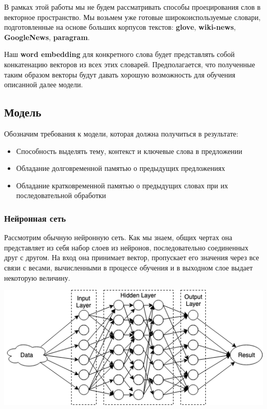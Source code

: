 В рамках этой работы мы не будем рассматривать способы проецирования слов в векторное пространство. Мы возьмем уже готовые широкоиспользуемые словари, подготовленные на основе больших корпусов текстов: \textbf{glove}, \textbf{wiki-news}, \textbf{GoogleNews}, \textbf{paragram}.

Наш \textbf{word embedding} для конкретного слова будет представлять собой конкатенацию векторов из всех этих словарей. Предполагается, что полученные таким образом векторы будут давать хорошую возможность для обучения описанной далее модели.

\subsection{Модель}

Обозначим требования к модели, которая должна получиться в результате:
\begin{itemize}
    \item Способность выделять тему, контекст и ключевые слова в предложении
    \item Обладание долговременной памятью о предыдущих предложениях
    \item Обладание кратковременной памятью о предыдущих словах при их последовательной обработки
\end{itemize}


\subsubsection{Нейронная сеть}
Рассмотрим обычную нейронную сеть. Как мы знаем, общих чертах она представляет из себя набор слоев из нейронов,  последовательно соединенных друг с другом. На вход она принимает вектор, пропускает его значения через все связи с весами, вычисленными в процессе обучения и в выходном слое выдает некоторую величину.

\begin{center} \includegraphics[width=450pt]{images/model_schema_3.png} \end{center}

